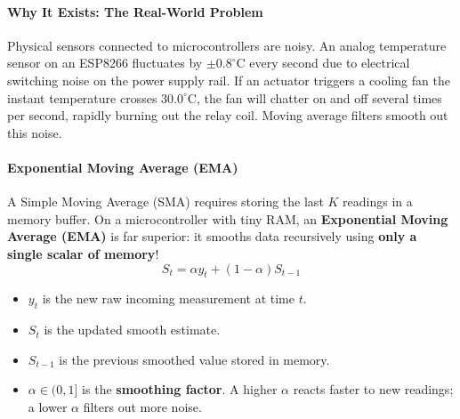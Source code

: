 \paragraph{Why It Exists: The Real-World Problem}
Physical sensors connected to microcontrollers are noisy. An analog temperature sensor on an ESP8266 fluctuates by $\pm 0.8^\circ\text{C}$ every second due to electrical switching noise on the power supply rail. If an actuator triggers a cooling fan the instant temperature crosses $30.0^\circ\text{C}$, the fan will chatter on and off several times per second, rapidly burning out the relay coil. Moving average filters smooth out this noise.

\paragraph{Exponential Moving Average (EMA)}
A Simple Moving Average (SMA) requires storing the last $K$ readings in a memory buffer. On a microcontroller with tiny RAM, an \textbf{Exponential Moving Average (EMA)} is far superior: it smooths data recursively using \textbf{only a single scalar of memory}!
\begin{equation}
S_t = \alpha y_t + (1 - \alpha) S_{t-1}\label{eq:ema_formula}
\end{equation}
\begin{itemize}
    \item $y_t$ is the new raw incoming measurement at time $t$.
    \item $S_t$ is the updated smooth estimate.
    \item $S_{t-1}$ is the previous smoothed value stored in memory.
    \item $\alpha \in (0, 1]$ is the \textbf{smoothing factor}. A higher $\alpha$ reacts faster to new readings; a lower $\alpha$ filters out more noise.
\end{itemize}

